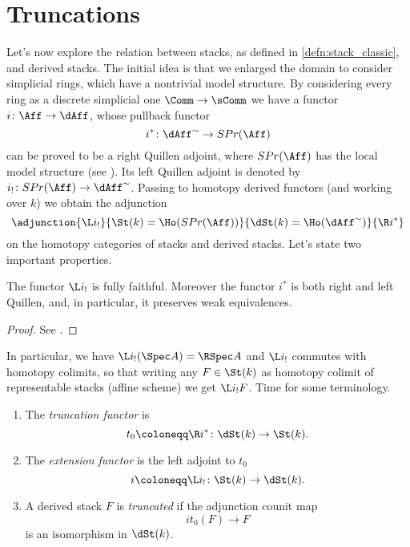    \section{Truncations}
        Let's now explore the relation between stacks, as defined in \cref{defn:stack_classic}, and derived stacks. The initial idea is that we enlarged the domain to consider simplicial rings, which have a nontrivial model structure.
        By considering every ring as a discrete simplicial one $\Comm \to \sComm$ we have a functor $i\colon \Aff \to \dAff$, whose pullback functor \[i^*\colon \dAff^{\sim} \to SPr(\Aff) \] can be proved to be a right Quillen adjoint, where $SPr(\Aff)$ has the local model structure (see \cite[2.2.4]{ToVe:hag2}). Its left Quillen adjoint is denoted by $i_{!}\colon SPr(\Aff) \to \dAff^{\sim}$. Passing to homotopy derived functors (and working over $k$) we obtain the adjunction 
        \[
            \adjunction{\L i_{!}}{\St(k) = \Ho(SPr(\Aff))}{\dSt(k) = \Ho(\dAff^{\sim})}{\R i^*}
        \]
        on the homotopy categories of stacks and derived stacks. Let's state two important properties.
        \begin{lemma}
            \label{lemma:embedding_fully_faithful}
            The functor $\L i_{!}$ is fully faithful. Moreover the functor $i^*$ is both right and left Quillen, and, in particular, it preserves weak equivalences.
        \end{lemma}
        \begin{proof}
            See \cite[Lemma~2.2.4.1, Lemma~2.2.4.2]{ToVe:hag2}.
        \end{proof}
        In particular, we have $\L i_{!}(\Spec A) = \RSpec A$ and $\L i_{!}$ commutes with homotopy colimits, so that writing any $F \in \St(k)$ as homotopy colimit of representable stacks (affine scheme) we get $\L i_{!}F$.
        Time for some terminology.
        \begin{defn}\hfill
            \label{defn:truncation}
            \begin{enumerate}
                \item The \emph{truncation functor} is \[t_0 \coloneqq \R i^*\colon \dSt(k) \to \St(k). \]
                \item The \emph{extension functor} is the left adjoint to $t_0$ \[i\coloneqq \L i_{!}\colon \St(k) \to \dSt(k). \]
                \item A derived stack $F$ is \emph{truncated} if the adjunction counit map \[it_0(F) \to F \] is an isomorphism in $\dSt(k)$.
            \end{enumerate}
        \end{defn}

